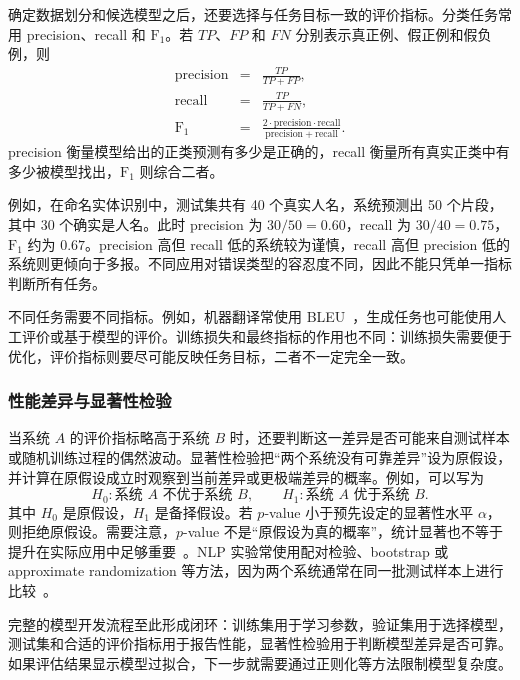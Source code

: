 确定数据划分和候选模型之后，还要选择与任务目标一致的评价指标。分类任务常用 precision、recall 和 $\mathrm{F}_1$。若 $TP$、$FP$ 和 $FN$ 分别表示真正例、假正例和假负例，则
\begin{eqnarray}
\mathrm{precision} &=& \frac{TP}{TP+FP},\\
\mathrm{recall} &=& \frac{TP}{TP+FN},\\
\mathrm{F}_1 &=&
\frac{2\cdot\mathrm{precision}\cdot\mathrm{recall}}
{\mathrm{precision}+\mathrm{recall}}.
\end{eqnarray}
precision 衡量模型给出的正类预测有多少是正确的，recall 衡量所有真实正类中有多少被模型找出，$\mathrm{F}_1$ 则综合二者。

例如，在命名实体识别中，测试集共有 40 个真实人名，系统预测出 50 个片段，其中 30 个确实是人名。此时 precision 为 $30/50=0.60$，recall 为 $30/40=0.75$，$\mathrm{F}_1$ 约为 $0.67$。precision 高但 recall 低的系统较为谨慎，recall 高但 precision 低的系统则更倾向于多报。不同应用对错误类型的容忍度不同，因此不能只凭单一指标判断所有任务。

不同任务需要不同指标。例如，机器翻译常使用 BLEU~\cite{PapineniEtAl2002BLEU}，生成任务也可能使用人工评价或基于模型的评价。训练损失和最终指标的作用也不同：训练损失需要便于优化，评价指标则要尽可能反映任务目标，二者不一定完全一致。

\subsubsection{性能差异与显著性检验}

当系统 $A$ 的评价指标略高于系统 $B$ 时，还要判断这一差异是否可能来自测试样本或随机训练过程的偶然波动。显著性检验把“两个系统没有可靠差异”设为原假设，并计算在原假设成立时观察到当前差异或更极端差异的概率。例如，可以写为
\[
H_0:\text{系统 }A\text{ 不优于系统 }B,
\qquad
H_1:\text{系统 }A\text{ 优于系统 }B.
\]
其中 $H_0$ 是原假设，$H_1$ 是备择假设。若 $p$-value 小于预先设定的显著性水平 $\alpha$，则拒绝原假设。需要注意，$p$-value 不是“原假设为真的概率”，统计显著也不等于提升在实际应用中足够重要~\cite{McClave-and-Sincich-2006,Freedman-et-al-2007,Freedman:2009}。NLP 实验常使用配对检验、bootstrap 或 approximate randomization 等方法，因为两个系统通常在同一批测试样本上进行比较~\cite{DrorEtAl2018Significance,Dror-et-al:2020}。

完整的模型开发流程至此形成闭环：训练集用于学习参数，验证集用于选择模型，测试集和合适的评价指标用于报告性能，显著性检验用于判断模型差异是否可靠。如果评估结果显示模型过拟合，下一步就需要通过正则化等方法限制模型复杂度。

